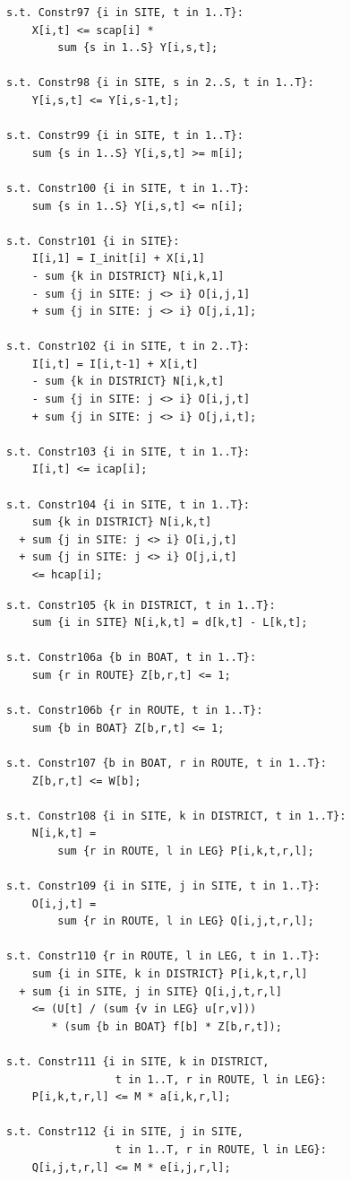 \documentclass[10pt]{article}
\begin{document}
\begin{minipage}[t]{0.48\textwidth}
\begin{verbatim}
s.t. Constr97 {i in SITE, t in 1..T}:
    X[i,t] <= scap[i] *
        sum {s in 1..S} Y[i,s,t];

s.t. Constr98 {i in SITE, s in 2..S, t in 1..T}:
    Y[i,s,t] <= Y[i,s-1,t];

s.t. Constr99 {i in SITE, t in 1..T}:
    sum {s in 1..S} Y[i,s,t] >= m[i];

s.t. Constr100 {i in SITE, t in 1..T}:
    sum {s in 1..S} Y[i,s,t] <= n[i];

s.t. Constr101 {i in SITE}:
    I[i,1] = I_init[i] + X[i,1]
    - sum {k in DISTRICT} N[i,k,1]
    - sum {j in SITE: j <> i} O[i,j,1]
    + sum {j in SITE: j <> i} O[j,i,1];

s.t. Constr102 {i in SITE, t in 2..T}:
    I[i,t] = I[i,t-1] + X[i,t]
    - sum {k in DISTRICT} N[i,k,t]
    - sum {j in SITE: j <> i} O[i,j,t]
    + sum {j in SITE: j <> i} O[j,i,t];

s.t. Constr103 {i in SITE, t in 1..T}:
    I[i,t] <= icap[i];

s.t. Constr104 {i in SITE, t in 1..T}:
    sum {k in DISTRICT} N[i,k,t]
  + sum {j in SITE: j <> i} O[i,j,t]
  + sum {j in SITE: j <> i} O[j,i,t]
    <= hcap[i];
\end{verbatim}
\end{minipage}
\hfill
\begin{minipage}[t]{0.48\textwidth}
\begin{verbatim}
s.t. Constr105 {k in DISTRICT, t in 1..T}:
    sum {i in SITE} N[i,k,t] = d[k,t] - L[k,t];

s.t. Constr106a {b in BOAT, t in 1..T}:
    sum {r in ROUTE} Z[b,r,t] <= 1;

s.t. Constr106b {r in ROUTE, t in 1..T}:
    sum {b in BOAT} Z[b,r,t] <= 1;

s.t. Constr107 {b in BOAT, r in ROUTE, t in 1..T}:
    Z[b,r,t] <= W[b];

s.t. Constr108 {i in SITE, k in DISTRICT, t in 1..T}:
    N[i,k,t] =
        sum {r in ROUTE, l in LEG} P[i,k,t,r,l];

s.t. Constr109 {i in SITE, j in SITE, t in 1..T}:
    O[i,j,t] =
        sum {r in ROUTE, l in LEG} Q[i,j,t,r,l];

s.t. Constr110 {r in ROUTE, l in LEG, t in 1..T}:
    sum {i in SITE, k in DISTRICT} P[i,k,t,r,l]
  + sum {i in SITE, j in SITE} Q[i,j,t,r,l]
    <= (U[t] / (sum {v in LEG} u[r,v]))
       * (sum {b in BOAT} f[b] * Z[b,r,t]);

s.t. Constr111 {i in SITE, k in DISTRICT,
                 t in 1..T, r in ROUTE, l in LEG}:
    P[i,k,t,r,l] <= M * a[i,k,r,l];

s.t. Constr112 {i in SITE, j in SITE,
                 t in 1..T, r in ROUTE, l in LEG}:
    Q[i,j,t,r,l] <= M * e[i,j,r,l];
\end{verbatim}
\end{minipage}
\normalsize
\newpage
\end{document}
